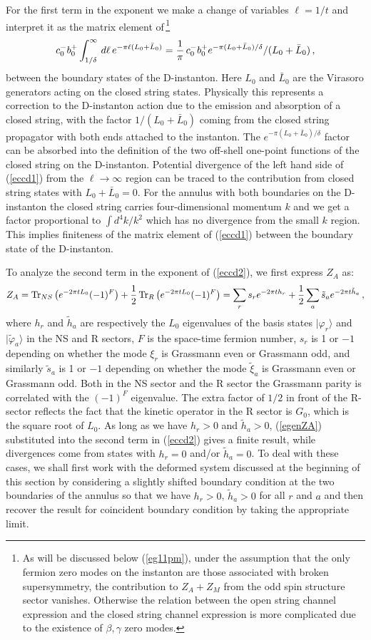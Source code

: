 \documentclass[12pt,a4paper]{article}
\newcommand{\be}{\begin{equation}}
\newcommand{\ee}{\end{equation}}
\newcommand{\refb}[1]{(\ref{#1})}
\def\Tr{{\rm Tr} }
\def\({\left(}
\def\){\right)}
\newcommand{\vp}{\varphi}
\begin{document}
For the first term in the exponent we make a change of variables $\ell=1/t$ and
interpret it as the matrix element of\,\footnote{As will be discussed below \refb{eg11pm},
under the assumption that the
only fermion zero modes on the instanton are those associated with broken supersymmetry,
the contribution to $Z_A+Z_M$ from the odd spin structure sector vanishes. Otherwise
the relation between the open string channel expression and the closed string channel
expression is more complicated due to the existence of $\beta,\gamma$ zero modes.}
\be\label{eccd1}
c_0^- b_0^+ \int_{1/\delta}^\infty \, d\ell \, e^{-\pi \ell (L_0+\bar L_0)}
= {1\over \pi}\, c_0^- b_0^+ e^{-\pi (L_0+\bar L_0)/\delta}/ (L_0+\bar L_0) \, ,
\ee
between the boundary states of the D-instanton. Here $L_0$ and $\bar L_0$ are
the Virasoro generators acting on the closed string states. Physically this represents a
correction to the D-instanton action due to the emission and absorption of a
closed string, with the factor $1/(L_0+\bar L_0)$ coming from the closed string propagator
with both ends attached to the instanton. The $e^{-\pi (L_0+\bar L_0)/\delta}$ factor
can be absorbed into the definition of the two off-shell one-point functions of the closed string on the D-instanton.
Potential divergence of the left hand side of \refb{eccd1} from
the $\ell\to\infty$ region can be traced to the contribution from
closed string states with $L_0+\bar L_0=0$.
For the annulus with both boundaries on the D-instanton the
closed string carries four-dimensional momentum $k$ and we get a factor proportional to
$\int d^4 k/k^2$ which has no divergence from the small $k$ region. This implies
finiteness of the matrix element of \refb{eccd1} between the
boundary state of the D-instanton.

To analyze the second term in the exponent of \refb{eccd2}, we first express $Z_A$ as:
\be \label{egenZA}
Z_A=\Tr_{NS}  \(e^{-2\pi t L_0} (-1)^F\) + {1\over 2} \, \Tr_{R}\( e^{-2\pi t L_0} (-1)^F\)
=  \sum_r s_r e^{-2\pi t h_r} +{1\over 2}\sum_a \tilde s_a e^{-2\pi t \tilde h_a}\, ,
\ee
where $h_r$ and $\tilde h_a$ are respectively the $L_0$ eigenvalues of the basis states
$|\vp_r\rangle$ and  $|\tilde\vp_a\rangle$ in the NS and R sectors, $F$ is the space-time fermion number,
$s_r$ is 1 or $-1$ depending on whether the mode $\xi_r$ is Grassmann even or Grassmann odd, and similarly
$\tilde s_a$ is 1 or $-1$ depending on whether the mode $\tilde\xi_a$ is Grassmann even or Grassmann odd.
Both in the NS sector and the R sector the Grassmann parity is correlated with the $(-1)^F$ eigenvalue.
The extra factor of $1/2$ in front of the R-sector reflects the fact that the kinetic operator in the
R sector is $G_0$, which is the square root of $L_0$.
As long as we have $h_r>0$ and $\tilde h_a>0$, \refb{egenZA} substituted into the second term
in \refb{eccd2} gives a finite result, while divergences come from states with $h_r=0$ and/or
$\tilde h_a=0$. To deal with these cases, we shall first work with the deformed system
discussed at the beginning of this section by considering a slightly shifted boundary
condition at the two boundaries of the annulus so that
we have $h_r>0$, $\tilde h_a>0$ for all $r$ and $a$ and then recover the result for
coincident boundary condition by taking the appropriate limit.
\end{document}
